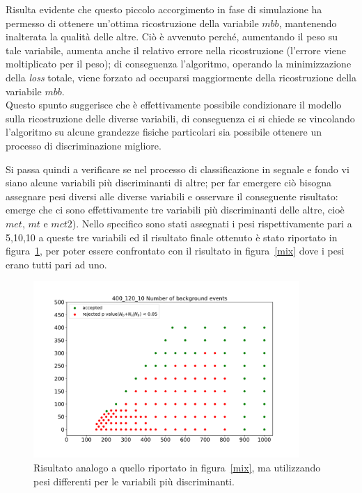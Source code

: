 Risulta evidente che questo piccolo accorgimento in fase di simulazione ha permesso di ottenere un'ottima ricostruzione della variabile $\textit{mbb}$, mantenendo inalterata la qualità delle altre. Ciò è avvenuto perché, aumentando il peso su tale variabile, aumenta anche il relativo errore nella ricostruzione (l'errore viene moltiplicato per il peso); di conseguenza l'algoritmo, operando la minimizzazione della \textit{loss} totale, viene forzato ad occuparsi maggiormente della ricostruzione della variabile $\textit{mbb}$. \\
Questo spunto suggerisce che è effettivamente possibile condizionare il modello sulla ricostruzione delle diverse variabili, di conseguenza ci si chiede se vincolando l'algoritmo su alcune grandezze fisiche particolari sia possibile ottenere un processo di discriminazione migliore.

\newpage

Si passa quindi a verificare se nel processo di classificazione in segnale e fondo vi siano alcune variabili più discriminanti di altre; per far emergere ciò bisogna assegnare pesi diversi alle diverse variabili e osservare il conseguente risultato: emerge che ci sono effettivamente tre variabili più discriminanti delle altre, cioè $\textit{met}$, $\textit{mt}$ e $\textit{mct2}$). Nello specifico sono stati assegnati i pesi rispettivamente pari a 5,10,10 a queste tre variabili ed il risultato finale ottenuto è stato riportato in figura~\ref{mix_ottimizzato}, per poter essere confrontato con il risultato in figura~\ref{mix} dove i pesi erano tutti pari ad uno.

\begin{figure}[h!]
	\centering
	\includegraphics[width=0.90\textwidth]{figs/risultati_simulazione/mix_ottimizzato.pdf}
	\caption{Risultato analogo a quello riportato in figura~\ref{mix}, ma utilizzando pesi differenti per le variabili più discriminanti.}
	\label{mix_ottimizzato}
\end{figure}

